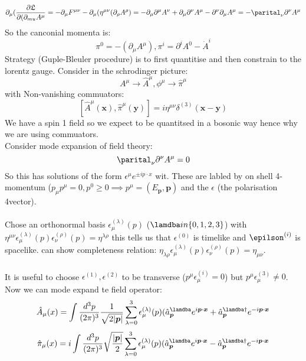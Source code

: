 \documentclass[12pt, a4paper, twoside, titlepage]{article}
\begin{document}
\begin{pmartix}
$$
                                                                \partial_{\mu} (\frac{\partial \mathfrak{L}}{\partial(\partial_{mu}A^{\mu}} = - \partial_{\mu} F^{\mu \nu} - \partial_{\mu} (\eta^{\mu \nu} (\partial_{\rho}A^{\rho}) =  - \partial_{\mu}\partial^{\mu} A^{\nu} + \partial_{\mu} \partial^{\nu} A^{\mu} - \partial^{\nu} \partial_{\mu} A^{\mu} = - \parital_{\nu}\partial^{\nu} A^{\mu}$$
                                                                So the canconial momenta is:
                                                                $$
\pi^0 = -(\partial_{\mu} A^{\mu}), \pi^i = \partial^i A^0 - \dot A^i
                                                                $$
Strategy (Guple-Bleuler procedure) is to first quantitise and then constrain to the lorentz gauge. Consider in the schrodinger picture:
$$
A^{\mu} \rightarrow \hat A^{\mu}, \phi^{\mu} \rightarrow \hat \pi^{\mu}
$$
with Non-vanishing commuators:
$$
[\hat A^{\mu} (\bm x), \hat \pi^{\mu}(\bm y)] = i \eta^{\mu \nu} \delta^{(3)}(\bm x - \bm y)
$$
We have a spin 1 field so we expect to be quantitsed in a bosonic way hence why we are using commuators. \\
Consider mode expansion of field theory:
$$
\parital_{\nu}\partial^{\nu} A^{\mu} = 0
$$
So this has solutions of the form $ \epsilon^{\mu} e^{\pm i p \cdot x}$ wit. These are labled by on shell 4-momentum ($p_{\mu}p^{\mu} = 0, p^0 \geq 0 \implies p^{\mu} = (E_{\bm p}, \bm p)$ and the $\epsilon$ (the polarisation 4vector).\\\\
Chose an orthonormal basis $\epsilon^{(\lambda)}_{\mu} (p)$ ($\lamdba in \{0,1,2,3\}$) with $\eta^{\mu \nu} \epsilon_{\mu}^{(\lambda)}(p) \epsilon_{\nu}^{(\rho)}(p) = \eta^{\lambda \rho}$ this  tells us that $\epsilon^{(0)}$ is timelike and $\epilson^{(i)}$ is spacelike. can show completeness relation: $\eta_{\lambda \rho} \epsilon_{\mu}^{(\lambda)}(p) \epsilon_{\nu}^{(\rho)}(p) = \eta_{\mu \nu}. $ \\\\
It is useful to choose $\epsilon^{(1)}, \epsilon^{(2)}$ to be transverse ($p^{\mu} \epsilon_{\mu}^{(i)} =0$) but $p^{\mu} \epsilon_{\mu}^{(3)} \neq 0$. Now we can mode expand te field operator:
$$
\hat A_{\mu}(x) = \int \frac{d^3 p}{(2\pi)^3} \frac{1}{\sqrt{2 |\bm p|}} \sum^3_{\lambda = 0} \epsilon^{(\lambda)}_{\mu} (p) (\hat a^{\lamdba}_{\bm p} e^{i \bm p \cdot \bm x} + \hat a^{\lamdba \dagger}_{\bm p} e^{-i \bm p \cdot \bm x}
$$
$$
\hat \pi_{\mu}(x) = i \int \frac{d^3 p}{(2\pi)^3} \sqrt{\frac{|\bm p|}{2}} \sum^3_{\lambda = 0} \epsilon^{(\lambda)}_{\mu} (p) (\hat a^{\lamdba}_{\bm p} e^{i \bm p \cdot \bm x} - \hat a^{\lamdba \dagger}_{\bm p} e^{-i \bm p \cdot \bm x}
$$
\end{pmartix}
\end{document}
